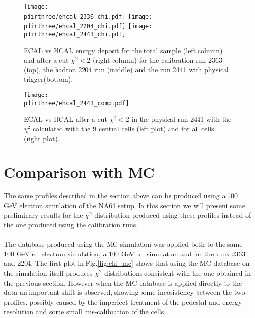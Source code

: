 \newpage
\begin{figure}[h!]
  \begin{center}
    \texttt{[image: \\pdirthree/ehcal\_2336\_chi.pdf]}
    \texttt{[image: \\pdirthree/ehcal\_2204\_chi.pdf]}
    \texttt{[image: \\pdirthree/ehcal\_2441\_chi.pdf]}
  \end{center}
  \caption[ECAL vs HCAL energy deposit after a cut $\chi^2$]{ECAL vs HCAL energy deposit for the total sample (left
    column) and after a cut $\chi^2<2$ (right column) for the
    calibration run 2363 (top), the hadron 2204 run (middle) and the run
    2441 with physical trigger(bottom).}
  \label{fig:ehcal_test}
\end{figure}
\clearpage

\begin{figure}[h!]
  \begin{center}
    \texttt{[image: \\pdirthree/ehcal\_2441\_comp.pdf]}
  \end{center}
  \caption[ECAL vs HCAL energy deposit after a cut $\chi^2$ for different ECAL configurations]{ECAL vs HCAL after a cut $\chi^2<2$ in the physical run
    2441 with the $\chi^2$ calculated with the 9 central cells (left
    plot) and for all cells (right plot).}
  \label{fig:ehcal_comp}
\end{figure}



\section{Comparison with MC}
\label{ch3:sec:mc}
The same profiles described in the section above can be produced using
a 100 GeV electron simulation of the NA64 setup\cite{na64-simulation}. In
this section we will present some preliminary results for the
$\chi^2$-distribution produced using these profiles instead of the one
produced using the calibration runs.
\\
\\
The database produced using the MC simulation was applied both to the
same 100 GeV $e^-$ electron simulation, a 100 GeV $\pi^-$ simulation
and for the runs 2363 and 2204.  The first plot in
Fig.\ref{fig:chi_mc} shows that using the MC-database on the
simulation itself produces $\chi^{2}$-distributions consistent with
the one obtained in the previous section. However when the MC-database
is applied directly to the data an important shift is observed,
showing some incosistency between the two profiles, possibly caused by
the imperfect treatment of the pedestal and energy resolution and some
small mis-calibration of the cells.


